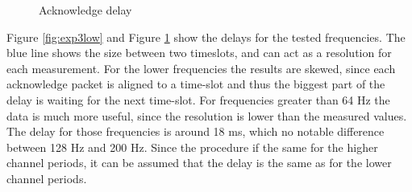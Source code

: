 \begin{description}
\begin{figure}[H]
		\caption{Acknowledge delay}\label{fig:exp3high}
	\end{figure}
	Figure \ref{fig:exp3low} and Figure \ref{fig:exp3high} show the delays for the tested frequencies. The blue line shows the size between two timeslots, and can act as a resolution for each measurement. For the lower frequencies the results are skewed, since each acknowledge packet is aligned to a time-slot and thus the biggest part of the delay is waiting for the next time-slot. For frequencies greater than 64 Hz the data is much more useful, since the resolution is lower than the measured values. The delay for those frequencies is around 18 ms, which no notable difference between 128 Hz and 200 Hz. Since the procedure if the same for the higher channel periods, it can be assumed that the delay is the same as for the lower channel periods.
\end{description}
\newpage


